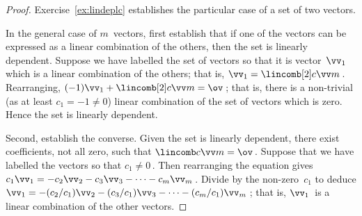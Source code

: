 \begin{proof} 
Exercise~\ref{ex:lindeplc} establishes the particular case of a set of two vectors.

In the general case of \(m\)~vectors, first establish that if one of the vectors can be expressed as a {linear combination} of the others, then the set is linearly dependent.
Suppose we have labelled the set of vectors so that it is vector~\(\vv_1\) which is a linear combination of the others; that is, \(\vv_1=\lincomb[2]c\vv m\)\,.
Rearranging, \((-1)\vv_1+\lincomb[2]c\vv m=\ov\)\,; that is, there is a non-trivial (as at least \(c_1=-1\neq0\)) linear combination of the set of vectors which is zero.
Hence the set is linearly dependent.

Second, establish the converse.  
Given the set is linearly dependent, there exist coefficients, not all zero, such that \(\lincomb c\vv m=\ov\)\,.  
Suppose that we have labelled the vectors so that \(c_1\neq 0\)\,.  
Then rearranging the equation gives
\(c_1\vv_1=-c_2\vv_2-c_3\vv_3-\cdots-c_m\vv_m\)\,.
Divide by the non-zero~\(c_1\) to deduce
\(\vv_1=-(c_2/c_1)\vv_2-(c_3/c_1)\vv_3-\cdots-(c_m/c_1)\vv_m\)\,;
that is, \(\vv_1\)~is a linear combination of the other vectors.
\end{proof}


